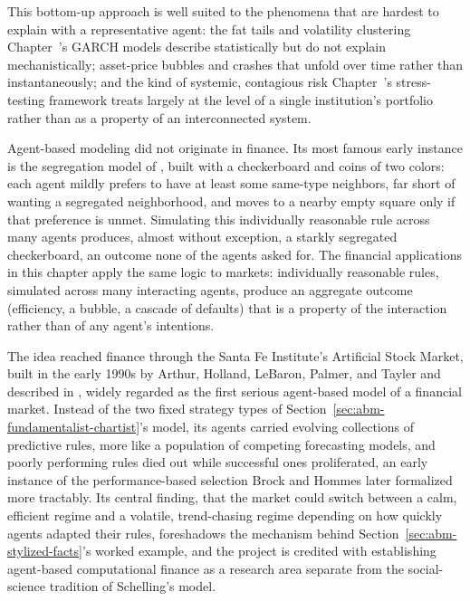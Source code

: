 \documentclass[../ai_in_finance]{subfiles}
\begin{document}
This bottom-up approach is well suited to the phenomena that are hardest to explain with a representative agent: the fat tails and volatility clustering Chapter~'s GARCH models describe statistically but do not explain mechanistically; asset-price bubbles and crashes that unfold over time rather than instantaneously; and the kind of systemic, contagious risk Chapter~'s stress-testing framework treats largely at the level of a single institution's portfolio rather than as a property of an interconnected system.

Agent-based modeling did not originate in finance. Its most famous early instance is the segregation model of \textcite{schelling1971dynamic}, built with a checkerboard and coins of two colors: each agent mildly prefers to have at least some same-type neighbors, far short of wanting a segregated neighborhood, and moves to a nearby empty square only if that preference is unmet. Simulating this individually reasonable rule across many agents produces, almost without exception, a starkly segregated checkerboard, an outcome none of the agents asked for. The financial applications in this chapter apply the same logic to markets: individually reasonable rules, simulated across many interacting agents, produce an aggregate outcome (efficiency, a bubble, a cascade of defaults) that is a property of the interaction rather than of any agent's intentions.

The idea reached finance through the Santa Fe Institute's Artificial Stock Market, built in the early 1990s by Arthur, Holland, LeBaron, Palmer, and Tayler and described in \textcite{arthur1997asset}, widely regarded as the first serious agent-based model of a financial market. Instead of the two fixed strategy types of Section~\ref{sec:abm-fundamentalist-chartist}'s model, its agents carried evolving collections of predictive rules, more like a population of competing forecasting models, and poorly performing rules died out while successful ones proliferated, an early instance of the performance-based selection Brock and Hommes later formalized more tractably. Its central finding, that the market could switch between a calm, efficient regime and a volatile, trend-chasing regime depending on how quickly agents adapted their rules, foreshadows the mechanism behind Section~\ref{sec:abm-stylized-facts}'s worked example, and the project is credited with establishing agent-based computational finance as a research area separate from the social-science tradition of Schelling's model.
\end{document}

